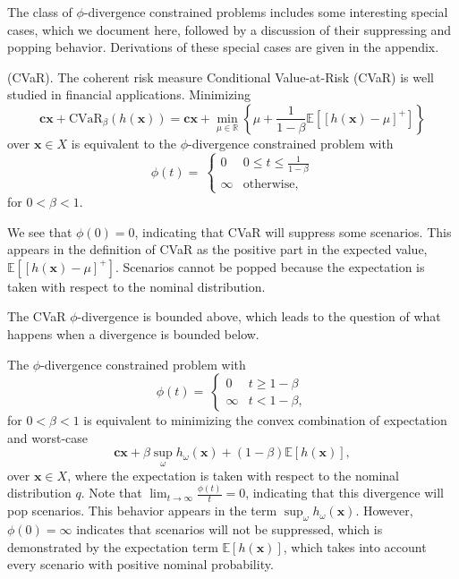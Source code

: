 \documentclass[opre,nonblindrev]{informs3} %
\newcommand{\R}{{\mathbb{R}}}
\newcommand{\E}{\mathbb{E}}
\newcommand{\e}[1]{\E \left[ #1 \right]}
\newcommand{\x}{\mathbf{x}}
\renewcommand{\c}{\mathbf{c}}
\begin{document}
The class of $\phi$-divergence constrained problems includes some interesting special cases, which we document here, followed by a discussion of their suppressing and popping behavior.
Derivations of these special cases are given in the appendix.

\begin{example}{(CVaR).}
	\label{ex:cvar}
	The coherent risk measure Conditional Value-at-Risk (CVaR) is well studied in financial applications.
	Minimizing
	\[
		\c\x + \text{CVaR}_\beta(h(\x)) = \c\x + \min_{\mu \in \R} \left\{ \mu + \frac{1}{1-\beta}\e{\left[h(\x)-\mu\right]^+} \right\}
	\]
	over $\x \in X$ is equivalent to the $\phi$-divergence constrained problem with
	\[
		\phi(t) = \
		\begin{cases}
			0 & 0 \leq t \leq \frac{1}{1-\beta} \\
			\infty & \text{otherwise},
		\end{cases}
	\]
	for $0 < \beta < 1$.

	We see that $\phi(0) = 0$, indicating that CVaR will suppress some scenarios.
	This appears in the definition of CVaR as the positive part in the expected value, $\e{[h(\x)-\mu]^+}$.
	Scenarios cannot be popped because the expectation is taken with respect to the nominal distribution.
\end{example}

The CVaR $\phi$-divergence is bounded above, which leads to the question of what happens when a divergence is bounded below.
\begin{example}
	\label{ex:rcvar}
	The $\phi$-divergence constrained problem with
	\[
		\phi(t) = \
		\begin{cases}
			0 & t \geq 1-\beta \\
			\infty & t < 1-\beta,
		\end{cases}
	\]
	for $0 < \beta < 1$ is equivalent to minimizing the convex combination of expectation and worst-case
	\[
		\c\x + \beta \sup_\omega h_\omega(\x) + (1-\beta)\e{h(\x)},
	\]
	over $\x \in X$, where the expectation is taken with respect to the nominal distribution $q$.
	Note that $\lim_{t \rightarrow \infty} \frac{\phi(t)}{t} = 0$, indicating that this divergence will pop scenarios.
	This behavior appears in the term $\sup_\omega h_\omega(\x)$.
	However, $\phi(0) = \infty$ indicates that scenarios will not be suppressed, which is demonstrated by the expectation term $\e{h(\x)}$, which takes into account every scenario with positive nominal probability.
\end{example}
\end{document}
